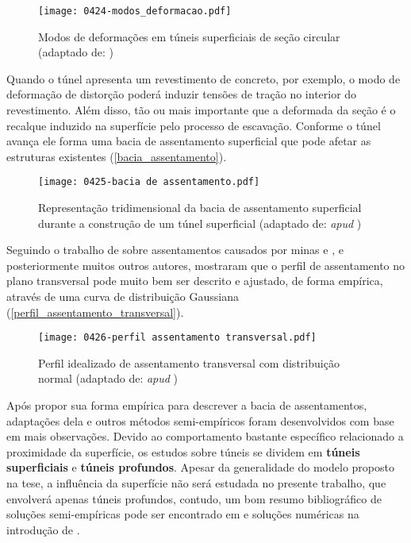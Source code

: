 \begin{figure}[H]
	\begin{center}
		\texttt{[image: 0424-modos\_deformacao.pdf]}
	\end{center}
	\caption{\label{modos_deformacao}Modos de deformações em túneis superficiais de seção circular (adaptado de: )}
\end{figure}

Quando o túnel apresenta um revestimento de concreto, por exemplo, o modo de deformação de distorção poderá induzir tensões de tração no interior do revestimento. Além disso, tão ou mais importante que a deformada da seção é o recalque induzido na superfície pelo processo de escavação. Conforme o túnel avança ele forma uma bacia de assentamento superficial que pode afetar as estruturas existentes (\autoref{bacia_assentamento}).

\begin{figure}[H]
	\begin{center}
		\texttt{[image: 0425-bacia de assentamento.pdf]}
	\end{center}
	\caption{\label{bacia_assentamento}Representação tridimensional da bacia de assentamento superficial durante a construção de um túnel superficial (adaptado de:  \textit{apud} )}
\end{figure}

Seguindo o trabalho de  sobre assentamentos causados por minas  e , e posteriormente muitos outros autores, mostraram que o perfil de assentamento no plano transversal pode muito bem ser descrito e ajustado, de forma empírica, através de uma curva de distribuição Gaussiana (\autoref{perfil_assentamento_transversal}).

\begin{figure}[H]
	\begin{center}
		\texttt{[image: 0426-perfil assentamento transversal.pdf]}
	\end{center}
	\caption{\label{perfil_assentamento_transversal}Perfil idealizado de assentamento transversal com distribuição normal (adaptado de:  \textit{apud} )}
\end{figure}

Após  propor sua forma empírica para descrever a bacia de assentamentos, adaptações dela e outros métodos semi-empíricos foram desenvolvidos com base em mais observações. Devido ao comportamento bastante específico relacionado a proximidade da superfície, os estudos sobre túneis se dividem em \textbf{túneis superficiais} e \textbf{túneis profundos}. Apesar da generalidade do modelo proposto na tese, a influência da superfície não será estudada no presente trabalho, que envolverá apenas túneis profundos, contudo, um bom resumo bibliográfico de soluções semi-empíricas pode ser encontrado em  e soluções numéricas na introdução de .

